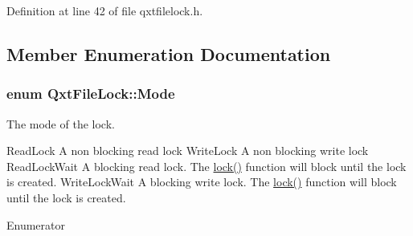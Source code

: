 Definition at line 42 of file qxtfilelock.\-h.



\subsection{Member Enumeration Documentation}
\hypertarget{class_qxt_file_lock_a98ad3e1055038fd611ad64755f794835}{
\subsubsection[{Mode}]{\setlength{\rightskip}{0pt plus 5cm}enum {\bf Qxt\-File\-Lock\-::\-Mode}}}\label{class_qxt_file_lock_a98ad3e1055038fd611ad64755f794835}


The mode of the lock. 

Read\-Lock A non blocking read lock  Write\-Lock A non blocking write lock  Read\-Lock\-Wait A blocking read lock. The \hyperlink{class_qxt_file_lock_a84af0691c49c83fb6d3c3352c56ba48f}{lock()} function will block until the lock is created.  Write\-Lock\-Wait A blocking write lock. The \hyperlink{class_qxt_file_lock_a84af0691c49c83fb6d3c3352c56ba48f}{lock()} function will block until the lock is created. \begin{Desc}
\item[Enumerator]\par
\begin{description}
\item[{\em 
\hypertarget{class_qxt_file_lock_a98ad3e1055038fd611ad64755f794835a86e726f4f6789c0de7340faffd11cd69}{Read\-Lock\-Wait}\label{class_qxt_file_lock_a98ad3e1055038fd611ad64755f794835a86e726f4f6789c0de7340faffd11cd69}
}]\item[{\em 
\hypertarget{class_qxt_file_lock_a98ad3e1055038fd611ad64755f794835a223d75634f685f407b41e2ba89e0c455}{Read\-Lock}\label{class_qxt_file_lock_a98ad3e1055038fd611ad64755f794835a223d75634f685f407b41e2ba89e0c455}
}]\item[{\em 
\hypertarget{class_qxt_file_lock_a98ad3e1055038fd611ad64755f794835a45a077cb75b9087e319da24486005ba2}{Write\-Lock\-Wait}\label{class_qxt_file_lock_a98ad3e1055038fd611ad64755f794835a45a077cb75b9087e319da24486005ba2}
}]\item[{\em 
\hypertarget{class_qxt_file_lock_a98ad3e1055038fd611ad64755f794835aa65a3bba221d8823412b16746b5a8c17}{Write\-Lock}\label{class_qxt_file_lock_a98ad3e1055038fd611ad64755f794835aa65a3bba221d8823412b16746b5a8c17}
}]\end{description}
\end{Desc}


